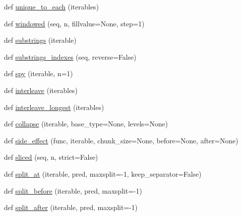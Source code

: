 \begin{DoxyCompactItemize}
def \hyperlink{namespacesetuptools_1_1__vendor_1_1more__itertools_1_1more_a376635631242926b94a755c4fa316b14}{unique\+\_\+to\+\_\+each} (iterables)
\item 
def \hyperlink{namespacesetuptools_1_1__vendor_1_1more__itertools_1_1more_a5c882dcbc34e6f2b1ea1c4397b4216a7}{windowed} (seq, n, fillvalue=None, step=1)
\item 
def \hyperlink{namespacesetuptools_1_1__vendor_1_1more__itertools_1_1more_a0ac8b3d5da622b2e8e4511742c29d7cf}{substrings} (iterable)
\item 
def \hyperlink{namespacesetuptools_1_1__vendor_1_1more__itertools_1_1more_a782003c7b272487483afea0d79b61642}{substrings\+\_\+indexes} (seq, reverse=False)
\item 
def \hyperlink{namespacesetuptools_1_1__vendor_1_1more__itertools_1_1more_aeb5af9ad47daaf34183f6d97f357854e}{spy} (iterable, n=1)
\item 
def \hyperlink{namespacesetuptools_1_1__vendor_1_1more__itertools_1_1more_a8fabcc02f91e91e6d29119251b3d627a}{interleave} (iterables)
\item 
def \hyperlink{namespacesetuptools_1_1__vendor_1_1more__itertools_1_1more_a3f0f308dbc9021aa791615be9106fcf8}{interleave\+\_\+longest} (iterables)
\item 
def \hyperlink{namespacesetuptools_1_1__vendor_1_1more__itertools_1_1more_a1f9b9d669e72d8284ed1d55eb3d6c730}{collapse} (iterable, base\+\_\+type=None, levels=None)
\item 
def \hyperlink{namespacesetuptools_1_1__vendor_1_1more__itertools_1_1more_ad8e7e1181b4034e1287ca835880ab196}{side\+\_\+effect} (func, iterable, chunk\+\_\+size=None, before=None, after=None)
\item 
def \hyperlink{namespacesetuptools_1_1__vendor_1_1more__itertools_1_1more_aef60074fb9074b75fdee79f9c5f330a5}{sliced} (seq, n, strict=False)
\item 
def \hyperlink{namespacesetuptools_1_1__vendor_1_1more__itertools_1_1more_a48991f9b47c87b9b92f472299ce47f99}{split\+\_\+at} (iterable, pred, maxsplit=-\/1, keep\+\_\+separator=False)
\item 
def \hyperlink{namespacesetuptools_1_1__vendor_1_1more__itertools_1_1more_a53b0179aebd5eebdea8737146e6c0d8d}{split\+\_\+before} (iterable, pred, maxsplit=-\/1)
\item 
def \hyperlink{namespacesetuptools_1_1__vendor_1_1more__itertools_1_1more_ab63f1dd5ede0301ffade1f2b8f808845}{split\+\_\+after} (iterable, pred, maxsplit=-\/1)
\item 

\end{DoxyCompactItemize}
